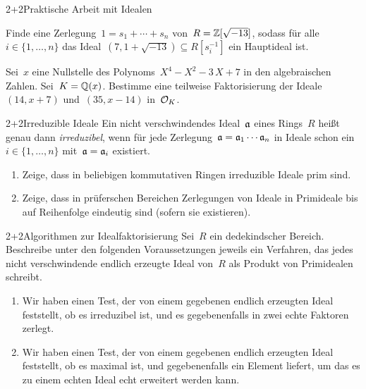 \documentclass{algblatt}
\begin{document}

\begin{aufgabeE}{2+2}{Praktische Arbeit mit Idealen}
\item Finde eine Zerlegung~$1 = s_1 + \cdots + s_n$ von~$R = \ZZ[\sqrt{-13}]$,
sodass für alle~$i \in \{ 1,\ldots,n \}$ das Ideal~$(7, 1 + \sqrt{-13})
\subseteq R[s_i^{-1}]$ ein Hauptideal ist.
\item Sei~$x$ eine Nullstelle des Polynoms~$X^4-X^2-3\,X+7$ in den
algebraischen Zahlen. Sei~$K = \QQ(x)$. Bestimme eine teilweise Faktorisierung
der Ideale~$(14,x+7)$ und~$(35,x-14)$ in~$\O_K$.
\end{aufgabeE}

\begin{aufgabe}{2+2}{Irreduzible Ideale}
Ein nicht verschwindendes Ideal~$\aa$ eines Rings~$R$ heißt genau dann
\emph{irreduzibel}, wenn für jede Zerlegung~$\aa = \aa_1 \cdots \aa_n$ in
Ideale schon ein~$i \in \{1,\ldots,n\}$ mit~$\aa = \aa_i$ existiert.
\begin{enumerate}
\item Zeige, dass in beliebigen kommutativen Ringen irreduzible Ideale
prim
sind.
\item Zeige, dass in prüferschen Bereichen Zerlegungen von Ideale in Primideale
bis auf Reihenfolge eindeutig sind (sofern sie existieren).
\end{enumerate}
\end{aufgabe}

\begin{aufgabe}{2+2}{Algorithmen zur Idealfaktorisierung}
Sei~$R$ ein dedekindscher Bereich. Beschreibe unter den folgenden
Voraussetzungen jeweils ein Verfahren, das jedes nicht verschwindende endlich erzeugte Ideal
von~$R$ als Produkt von Primidealen schreibt.
\begin{enumerate}
\item Wir haben einen Test, der von einem gegebenen endlich erzeugten Ideal feststellt,
ob es irreduzibel ist, und es gegebenenfalls in zwei echte Faktoren zerlegt.
\item Wir haben einen Test, der von einem gegebenen endlich erzeugten Ideal
feststellt, ob es maximal ist, und gegebenenfalls ein Element liefert, um das
es zu einem echten Ideal echt erweitert werden kann.
\end{enumerate}
\end{aufgabe}
\end{document}
